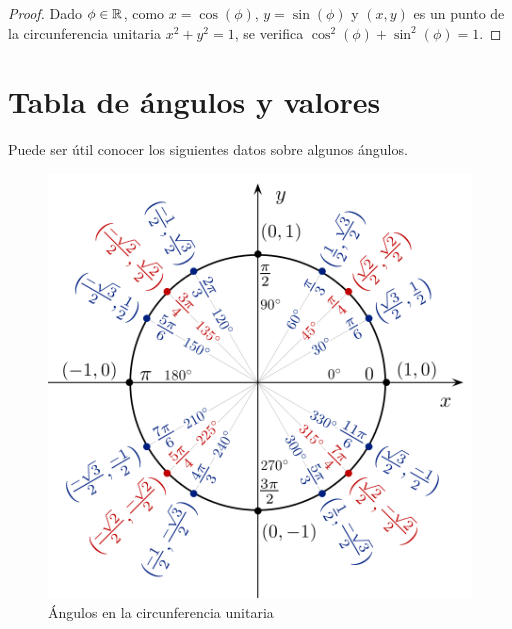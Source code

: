 \begin{proof}
Dado $\phi \in \mathbb{R}$, como $x = \cos(\phi)$, $y = \sin(\phi)$ y $(x,y)$ es un punto de la circunferencia unitaria $x^2 + y^2 = 1$, se verifica $\cos^2(\phi) + \sin^2(\phi) = 1$.
\end{proof}



\section{Tabla de ángulos y valores} 

Puede ser útil conocer los siguientes datos sobre algunos ángulos.

\begin{figure}[h]
\centering\includegraphics[scale=0.5]{images/01_precalculo/unit_circle_angles_color.png}
\caption{Ángulos en la circunferencia unitaria}
\end{figure}

